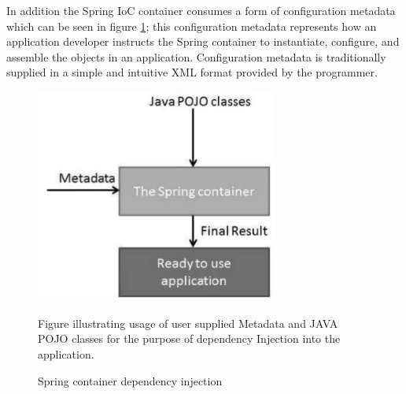 In addition the Spring IoC container consumes a form of configuration metadata which can be seen in figure \ref{fig:spring_ioc_container_pic}; this configuration metadata represents how an application developer instructs the Spring container to instantiate, configure, and assemble the objects in an application. Configuration metadata is traditionally supplied in a simple and intuitive XML format provided by the programmer.

\begin{figure} 
\centering
\includegraphics[width=8cm]{pictures/spring_ioc_container.jpg}
\caption{Spring container dependency injection}
Figure illustrating usage of user supplied Metadata and JAVA POJO classes for the purpose of dependency Injection into the application.
\label{fig:spring_ioc_container_pic}
\end{figure}


